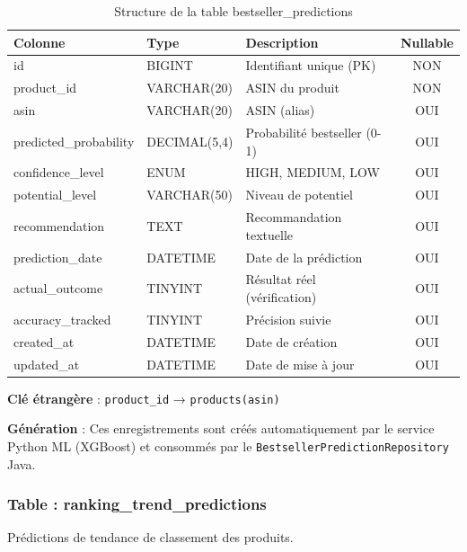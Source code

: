\documentclass[12pt,a4paper]{report}
\begin{document}
\begin{table}[H]
    \centering
    \caption{Structure de la table bestseller\_predictions}
    \begin{tabularx}{\textwidth}{llXc}
        \toprule
        \textbf{Colonne} & \textbf{Type} & \textbf{Description} & \textbf{Nullable} \\
        \midrule
        id & BIGINT & Identifiant unique (PK) & NON \\
        product\_id & VARCHAR(20) & ASIN du produit & NON \\
        asin & VARCHAR(20) & ASIN (alias) & OUI \\
        predicted\_probability & DECIMAL(5,4) & Probabilité bestseller (0-1) & OUI \\
        confidence\_level & ENUM & HIGH, MEDIUM, LOW & OUI \\
        potential\_level & VARCHAR(50) & Niveau de potentiel & OUI \\
        recommendation & TEXT & Recommandation textuelle & OUI \\
        prediction\_date & DATETIME & Date de la prédiction & OUI \\
        actual\_outcome & TINYINT & Résultat réel (vérification) & OUI \\
        accuracy\_tracked & TINYINT & Précision suivie & OUI \\
        created\_at & DATETIME & Date de création & OUI \\
        updated\_at & DATETIME & Date de mise à jour & OUI \\
        \bottomrule
    \end{tabularx}
    \label{tab:bestseller_predictions}
\end{table}

\textbf{Clé étrangère} : \texttt{product\_id} → \texttt{products(asin)}

\textbf{Génération} : Ces enregistrements sont créés automatiquement par le service Python ML (XGBoost) et consommés par le \texttt{BestsellerPredictionRepository} Java.

\subsubsection{Table : ranking\_trend\_predictions}

Prédictions de tendance de classement des produits.
\end{document}

